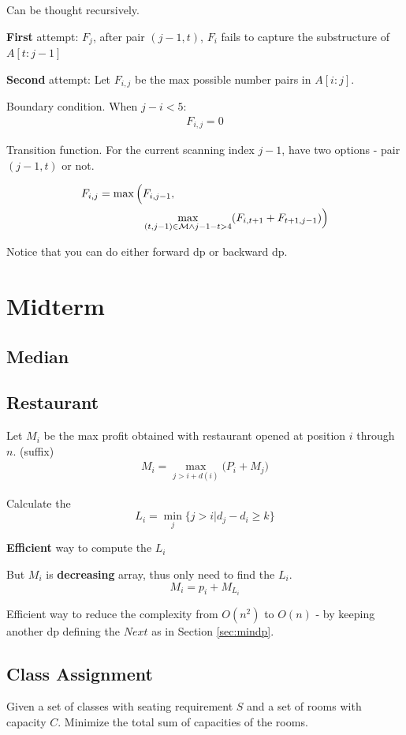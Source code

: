 \documentclass[a4paper]{report}
\theoremstyle{definition}
\begin{document}
Can be thought recursively.

\textbf{First} attempt: $F_j$, after pair $(j-1, t)$, $F_i$ fails to capture the substructure of $A[t:j-1]$

\textbf{Second} attempt: Let $F_{i,j}$ be the max possible number pairs in $A[i:j]$.

Boundary condition. When $j-i<5$:
\begin{align*}
F_{i, j} = 0
\end{align*}

Transition function. For the current scanning index $j-1$, have two options - pair $(j-1, t)$ or not.

\begin{align*}
F_{i, j} = \max\Big(&F_{i, j-1}, \\
& \max_{(t, j-1) \in \mathcal{M} \wedge j-1-t>4} (F_{i, t+1}+F_{t+1, j-1})\Big)
\end{align*}

Notice that you can do either forward dp or backward dp.

\section{Midterm}
\subsection{Median}
\subsection{Restaurant}
Let $M_i$ be the max profit obtained with restaurant opened at position $i$ through $n$. (suffix)
\begin{align*}
M_i = \max_{j>i+d(i)} \Big(P_i + M_j\Big)
\end{align*}

Calculate the
$$L_i=\min_j\{j>i|d_j - d_i \geq k\}$$

\textbf{Efficient} way to compute the $L_i$

But $M_i$ is \textbf{decreasing} array, thus only need to find the $L_i$.
$$
M_i = p_i + M_{L_i}
$$

Efficient way to reduce the complexity from $O(n^2)$ to $O(n)$ - by keeping another dp defining the $Next$ as in Section \ref{sec:mindp}.
\subsection{Class Assignment}
Given a set of classes with seating requirement $S$ and a set of rooms with capacity $C$. Minimize the total sum of capacities of the rooms. 
\end{document}
